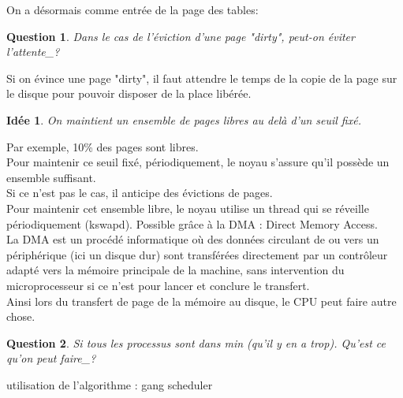 \documentclass[12pt,a4paper]{report}
\newtheorem*{q}{Question}
\newtheorem*{id}{Idée}
\begin{document}
On a désormais comme entrée de la page des tables:\\
\begin{center}
\end{center}

\begin{q}Dans le cas de l'éviction d'une page "dirty", peut-on éviter l'attente_?\end{q}
Si on évince une page "dirty", il faut attendre le temps de la copie de la page sur le disque pour pouvoir disposer de la place libérée.\\

\begin{id} On maintient un ensemble de pages libres au delà d'un seuil fixé.\end{id}
Par exemple, 10\% des pages sont libres.\\

Pour maintenir ce seuil fixé, périodiquement, le noyau s'assure qu'il possède un ensemble suffisant.\\
Si ce n'est pas le cas, il anticipe des évictions de pages.\\
Pour maintenir cet ensemble libre, le noyau utilise un thread qui se réveille périodiquement (kswapd). Possible grâce à la DMA : Direct Memory Access.\\

La DMA est un procédé informatique où des données circulant de ou vers un périphérique (ici un disque dur) sont transférées directement par un contrôleur adapté vers la mémoire principale de la machine, sans intervention du microprocesseur si ce n'est pour lancer et conclure le transfert.\\

Ainsi lors du transfert de page de la mémoire au disque, le CPU peut faire autre chose.\\

\begin{q}
Si tous les processus sont dans min (qu'il y en a trop). Qu'est ce qu'on peut faire_?\end{q}
utilisation de l’algorithme : gang scheduler
\end{document}
